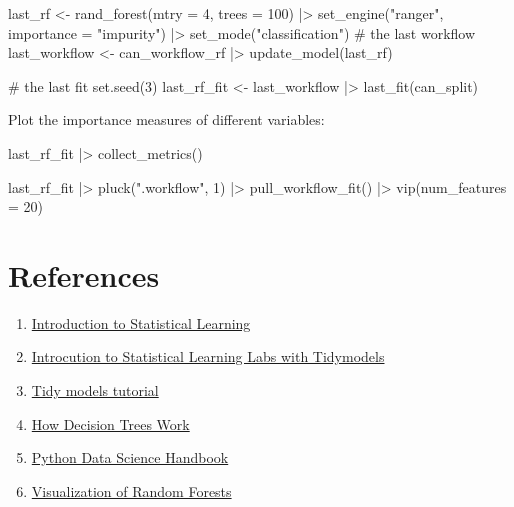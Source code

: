 \documentclass[
  letterpaper,
  DIV=11,
  numbers=noendperiod]{scrreprt}
\newenvironment{Shaded}{\begin{snugshade}}{\end{snugshade}}
\newcommand{\NormalTok}[1]{\textcolor[rgb]{0.00,0.23,0.31}{#1}}
\begin{document}
\begin{Shaded}
\begin{Highlighting}[]
\NormalTok{last\_rf \textless{}{-} }
\NormalTok{  rand\_forest(mtry = 4, trees = 100) |\textgreater{} }
\NormalTok{  set\_engine("ranger",  importance = "impurity") |\textgreater{} }
\NormalTok{  set\_mode("classification")}
\NormalTok{\# the last workflow}
\NormalTok{last\_workflow \textless{}{-} }
\NormalTok{  can\_workflow\_rf |\textgreater{} }
\NormalTok{  update\_model(last\_rf)}

\NormalTok{\# the last fit}
\NormalTok{set.seed(3)}
\NormalTok{last\_rf\_fit \textless{}{-} }
\NormalTok{  last\_workflow |\textgreater{} }
\NormalTok{  last\_fit(can\_split)}
\end{Highlighting}
\end{Shaded}

Plot the importance measures of different variables:

\begin{Shaded}
\begin{Highlighting}[]

\NormalTok{last\_rf\_fit |\textgreater{} }
\NormalTok{  collect\_metrics()}

\NormalTok{last\_rf\_fit |\textgreater{} }
\NormalTok{  pluck(".workflow", 1) |\textgreater{}   }
\NormalTok{  pull\_workflow\_fit() |\textgreater{} }
\NormalTok{  vip(num\_features = 20)}
\end{Highlighting}
\end{Shaded}

\section{References}\label{references-2}

\begin{enumerate}
\def\labelenumi{\arabic{enumi}.}
\item
  \href{https://www.statlearning.com/}{Introduction to Statistical
  Learning}
\item
  \href{https://emilhvitfeldt.github.io/ISLR-tidymodels-labs/}{Introcution
  to Statistical Learning Labs with Tidymodels}
\item
  \href{https://www.tidymodels.org/start/case-study/}{Tidy models
  tutorial}
\item
  \href{https://dataaspirant.com/how-decision-tree-algorithm-works/}{How
  Decision Trees Work}
\item
  \href{https://jakevdp.github.io/PythonDataScienceHandbook/05.08-random-forests.html}{Python
  Data Science Handbook}
\item
  \href{https://towardsdatascience.com/rfviz-an-interactive-visualization-package-for-random-forests-in-r-8fb71709c8bf}{Visualization
  of Random Forests}
\end{enumerate}
\end{document}

